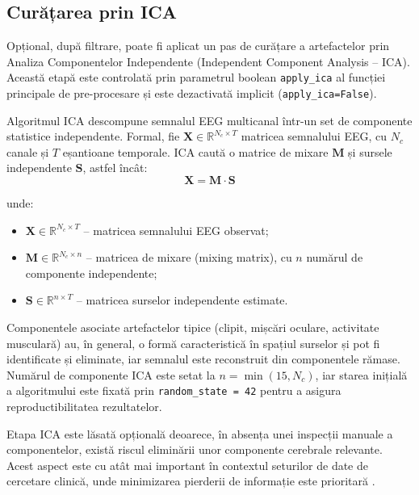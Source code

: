 \documentclass[12pt,a4paper]{report}
\theoremstyle{definition}
\theoremstyle{remark}
\begin{document}
\subsection{Curățarea prin ICA}
\label{sec:ica}

Opțional, după filtrare, poate fi aplicat un pas de curățare a artefactelor prin Analiza Componentelor Independente (Independent Component Analysis -- ICA). Această etapă este controlată prin parametrul boolean \texttt{apply\_ica} al funcției principale de pre-procesare și este dezactivată implicit (\texttt{apply\_ica=False}).

Algoritmul ICA descompune semnalul EEG multicanal într-un set de componente statistice independente. Formal, fie $\mathbf{X} \in \mathbb{R}^{N_c \times T}$ matricea semnalului EEG, cu $N_c$ canale și $T$ eșantioane temporale. ICA caută o matrice de mixare $\mathbf{M}$ și sursele independente $\mathbf{S}$, astfel încât:
\begin{equation}
    \mathbf{X} = \mathbf{M} \cdot \mathbf{S}
    \label{eq:ica}
\end{equation}

\noindent unde:
\begin{itemize}
    \item $\mathbf{X} \in \mathbb{R}^{N_c \times T}$ -- matricea semnalului EEG observat;
    \item $\mathbf{M} \in \mathbb{R}^{N_c \times n}$ -- matricea de mixare (mixing matrix), cu $n$ numărul de componente independente;
    \item $\mathbf{S} \in \mathbb{R}^{n \times T}$ -- matricea surselor independente estimate.
\end{itemize}

Componentele asociate artefactelor tipice (clipit, mișcări oculare, activitate musculară) au, în general, o formă caracteristică în spațiul surselor și pot fi identificate și eliminate, iar semnalul este reconstruit din componentele rămase. Numărul de componente ICA este setat la $n = \min(15, N_c)$, iar starea inițială a algoritmului este fixată prin \texttt{random\_state = 42} pentru a asigura reproductibilitatea rezultatelor.

Etapa ICA este lăsată opțională deoarece, în absența unei inspecții manuale a componentelor, există riscul eliminării unor componente cerebrale relevante. Acest aspect este cu atât mai important în contextul seturilor de date de cercetare clinică, unde minimizarea pierderii de informație este prioritară \cite{awais2024graphical,rahman2025advancement}.
\end{document}
